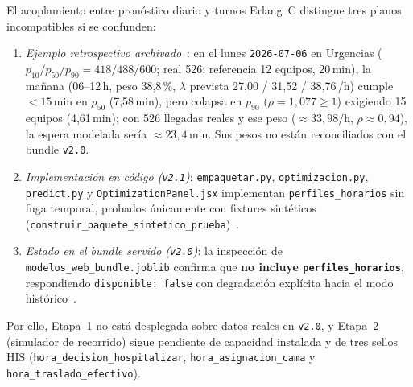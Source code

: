 El acoplamiento entre pronóstico diario y turnos Erlang~C distingue tres planos incompatibles si se confunden:
\begin{enumerate}[leftmargin=*,nosep]
\item \textit{Ejemplo retrospectivo archivado}~\cite{mediflow2026optimizacion}: en el lunes \texttt{2026-07-06} en Urgencias ($p_{10}/p_{50}/p_{90} = 418/488/600$; real 526; referencia 12 equipos, 20\,min), la mañana (06--12\,h, peso 38,8\,\%, $\lambda$ prevista 27,00 / 31,52 / 38,76\,/h) cumple $<15$\,min en $p_{50}$ (7,58\,min), pero colapsa en $p_{90}$ ($\rho = 1{,}077 \ge 1$) exigiendo 15 equipos (4,61\,min); con 526 llegadas reales y ese peso ($\approx 33{,}98/\text{h}$, $\rho \approx 0{,}94$), la espera modelada sería $\approx 23{,}4$\,min. Sus pesos no están reconciliados con el bundle \texttt{v2.0}.
\item \textit{Implementación en código (\texttt{v2.1})}: \texttt{empaquetar.py}, \texttt{optimizacion.py}, \texttt{predict.py} y \texttt{OptimizationPanel.jsx} implementan \texttt{perfiles\_horarios} sin fuga temporal, probados únicamente con fixtures sintéticos (\texttt{construir\_paquete\_sintetico\_prueba})~\cite{mediflow2026informe,mediflow2026auditoria}.
\item \textit{Estado en el bundle servido (\texttt{v2.0})}: la inspección de \texttt{modelos\_web\_bundle.joblib} confirma que \textbf{no incluye \texttt{perfiles\_horarios}}, respondiendo \texttt{disponible: false} con degradación explícita hacia el modo histórico~\cite{mediflow2026bundle,mediflow2026auditoria}.
\end{enumerate}
Por ello, Etapa~1 no está desplegada sobre datos reales en \texttt{v2.0}, y Etapa~2 (simulador de recorrido) sigue pendiente de capacidad instalada y de tres sellos HIS (\texttt{hora\_\allowbreak decision\_\allowbreak hospitalizar}, \texttt{hora\_\allowbreak asignacion\_\allowbreak cama} y \texttt{hora\_\allowbreak traslado\_\allowbreak efectivo}).
